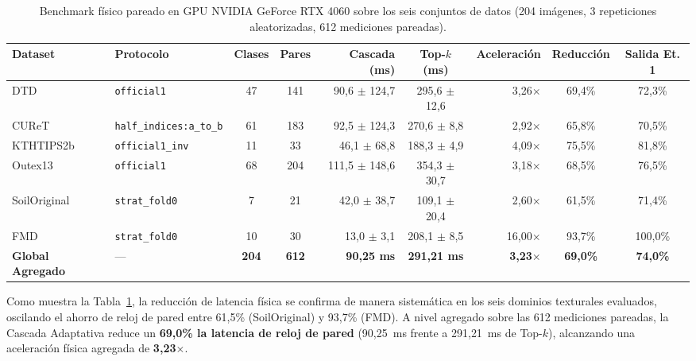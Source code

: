 \begin{table}[!htbp]
\centering
\caption{Benchmark físico pareado en GPU NVIDIA GeForce RTX 4060 sobre los seis conjuntos de datos (204 imágenes, 3 repeticiones aleatorizadas, 612 mediciones pareadas).}
\label{tab:gpu-benchmark}
\fontsize{7.5}{9.5}\selectfont
\setlength{\tabcolsep}{2.5pt}
\begin{tabular}{@{}llccrcrcc@{}}
\toprule
Dataset & Protocolo & Clases & Pares & Cascada (ms) & Top-$k$ (ms) & Aceleración & Reducción & Salida Et. 1 \\
\midrule
DTD & \texttt{official1} & 47 & 141 & 90{,}6 $\pm$ 124{,}7 & 295{,}6 $\pm$ 12{,}6 & 3{,}26$\times$ & 69{,}4\% & 72{,}3\% \\
CUReT & \texttt{half\_indices:a\_to\_b} & 61 & 183 & 92{,}5 $\pm$ 124{,}3 & 270{,}6 $\pm$ 8{,}8 & 2{,}92$\times$ & 65{,}8\% & 70{,}5\% \\
KTHTIPS2b & \texttt{official1\_inv} & 11 & 33 & 46{,}1 $\pm$ 68{,}8 & 188{,}3 $\pm$ 4{,}9 & 4{,}09$\times$ & 75{,}5\% & 81{,}8\% \\
Outex13 & \texttt{official1} & 68 & 204 & 111{,}5 $\pm$ 148{,}6 & 354{,}3 $\pm$ 30{,}7 & 3{,}18$\times$ & 68{,}5\% & 76{,}5\% \\
SoilOriginal & \texttt{strat\_fold0} & 7 & 21 & 42{,}0 $\pm$ 38{,}7 & 109{,}1 $\pm$ 20{,}4 & 2{,}60$\times$ & 61{,}5\% & 71{,}4\% \\
FMD & \texttt{strat\_fold0} & 10 & 30 & 13{,}0 $\pm$ 3{,}1 & 208{,}1 $\pm$ 8{,}5 & 16{,}00$\times$ & 93{,}7\% & 100{,}0\% \\
\midrule
\textbf{Global Agregado} & — & \textbf{204} & \textbf{612} & \textbf{90{,}25 ms} & \textbf{291{,}21 ms} & \textbf{3{,}23$\times$} & \textbf{69{,}0\%} & \textbf{74{,}0\%} \\
\bottomrule
\end{tabular}
\end{table}

Como muestra la Tabla~\ref{tab:gpu-benchmark}, la reducción de latencia física se confirma de manera sistemática en los seis dominios texturales evaluados, oscilando el ahorro de reloj de pared entre 61{,}5\% (SoilOriginal) y 93{,}7\% (FMD). A nivel agregado sobre las 612 mediciones pareadas, la Cascada Adaptativa reduce un \textbf{69{,}0\% la latencia de reloj de pared} (90{,}25~ms frente a 291{,}21~ms de Top-$k$), alcanzando una aceleración física agregada de \textbf{3{,}23$\times$}.

